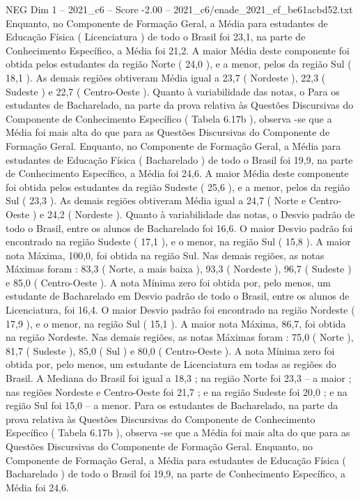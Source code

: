 \begin{textsample}{NEG Dim 1 – 2021\_c6 – Score -2.00 – 2021\_c6/enade\_2021\_ef\_be61acbd52.txt}
Enquanto, no Componente de Formação Geral, a Média para estudantes de Educação Física ( Licenciatura ) de todo o Brasil foi 23,1, na parte de Conhecimento Específico, a Média foi 21,2.
A maior Média deste componente foi obtida pelos estudantes da região Norte ( 24,0 ), e a menor, pelos da região Sul ( 18,1 ).
As demais regiões obtiveram Média igual a 23,7 ( Nordeste ), 22,3 ( Sudeste ) e 22,7 ( Centro-Oeste ).
Quanto à variabilidade das notas, o Para os estudantes de Bacharelado, na parte da prova relativa às Questões Discursivas do Componente de Conhecimento Específico ( Tabela 6.17b ), observa -se que a Média foi mais alta do que para as Questões Discursivas do Componente de Formação Geral.
Enquanto, no Componente de Formação Geral, a Média para estudantes de Educação Física ( Bacharelado ) de todo o Brasil foi 19,9, na parte de Conhecimento Específico, a Média foi 24,6.
A maior Média deste componente foi obtida pelos estudantes da região Sudeste ( 25,6 ), e a menor, pelos da região Sul ( 23,3 ).
As demais regiões obtiveram Média igual a 24,7 ( Norte e Centro-Oeste ) e 24,2 ( Nordeste ).
Quanto à variabilidade das notas, o Desvio padrão de todo o Brasil, entre os alunos de Bacharelado foi 16,6.
O maior Desvio padrão foi encontrado na região Sudeste ( 17,1 ), e o menor, na região Sul ( 15,8 ).
A maior nota Máxima, 100,0, foi obtida na região Sul.
Nas demais regiões, as notas Máximas foram : 83,3 ( Norte, a mais baixa ), 93,3 ( Nordeste ), 96,7 ( Sudeste ) e 85,0 ( Centro-Oeste ).
A nota Mínima zero foi obtida por, pelo menos, um estudante de Bacharelado em Desvio padrão de todo o Brasil, entre os alunos de Licenciatura, foi 16,4.
O maior Desvio padrão foi encontrado na região Nordeste ( 17,9 ), e o menor, na região Sul ( 15,1 ).
A maior nota Máxima, 86,7, foi obtida na região Nordeste.
Nas demais regiões, as notas Máximas foram : 75,0 ( Norte ), 81,7 ( Sudeste ), 85,0 ( Sul ) e 80,0 ( Centro-Oeste ).
A nota Mínima zero foi obtida por, pelo menos, um estudante de Licenciatura em todas as regiões do Brasil.
A Mediana do Brasil foi igual a 18,3 ; na região Norte foi 23,3 – a maior ; nas regiões Nordeste e Centro-Oeste foi 21,7 ; e na região Sudeste foi 20,0 ; e na região Sul foi 15,0 – a menor.
Para os estudantes de Bacharelado, na parte da prova relativa às Questões Discursivas do Componente de Conhecimento Específico ( Tabela 6.17b ), observa -se que a Média foi mais alta do que para as Questões Discursivas do Componente de Formação Geral.
Enquanto, no Componente de Formação Geral, a Média para estudantes de Educação Física ( Bacharelado ) de todo o Brasil foi 19,9, na parte de Conhecimento Específico, a Média foi 24,6.

\end{textsample}
